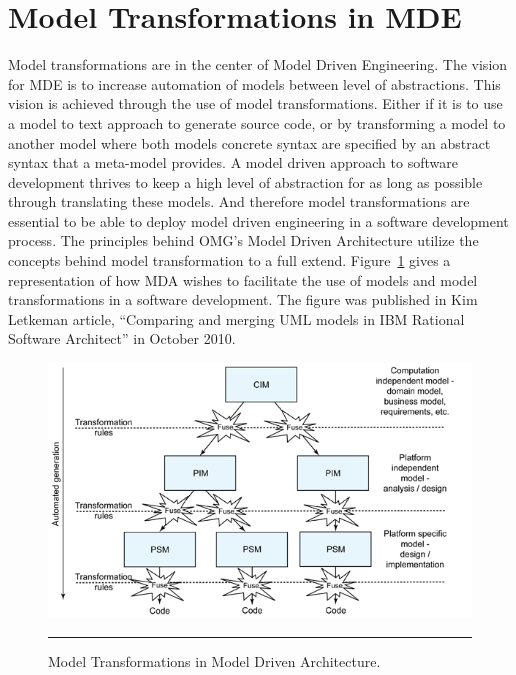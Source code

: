 \section{Model Transformations in MDE}

Model transformations are in the center of Model Driven Engineering.
The vision for MDE is to increase automation of models between level of
abstractions. This vision is achieved through the use of model transformations.
Either if it is to use a model to text approach to generate source code, or by
transforming a model to another model where both models concrete syntax are
specified by an abstract syntax that a meta-model provides. A model driven
approach to software development thrives to keep a high level of abstraction
for as long as possible through translating these models. And therefore model
transformations are essential to be able to deploy model driven engineering in
a software development process. The principles behind OMG's Model Driven
Architecture utilize the concepts behind model transformation to a full extend.
Figure~\ref{fig:MDE_MDA_MT} gives a representation of how MDA wishes to
facilitate the use of models and model transformations in a software
development. The figure was published in Kim Letkeman article, ``Comparing and
merging UML models in IBM Rational Software
Architect''\cite{letkeman2005comparing} in October 2010.

\begin{figure}[H]
  \centering
    \includegraphics[scale=0.8]{./Figures/MDA_MDE.png}
    \rule{35em}{0.5pt}
  \caption[Model Transformations in MDA]
  				{Model Transformations in Model Driven Architecture.}
  \label{fig:MDE_MDA_MT}
\end{figure}

